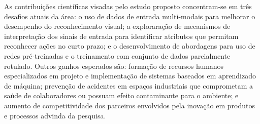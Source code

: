 As contribuições científicas visadas pelo estudo proposto concentram-se em três desafios atuais da área: o uso de dados de entrada multi-modais para melhorar o desempenho do reconhecimento visual; a exploraração de mecanismos de interpretação dos sinais de entrada para identificar atributos que permitam reconhecer ações no curto prazo; e o desenvolvimento de abordagens para uso de redes pré-treinadas e o treinamento com conjunto de dados parcialmente rotulado.
%
Outros ganhos esperados são: formação de recursos humanos especializados em projeto e implementação de sistemas baseados em aprendizado de máquina; prevenção de acidentes em espaços industriais que comprometam a saúde de colaboradores ou possuam efeito contaminante para o ambiente; e aumento de competitividade dos parceiros envolvidos pela inovação em produtos e processos advinda da pesquisa.

